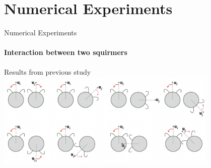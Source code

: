 \documentclass{beamer}
\begin{document}
\section{Numerical Experiments}
\begin{frame}{Numerical Experiments}
    \framesubtitle{Interaction between two squirmers}
    \begin{center}
        Results from previous study \cite{Stark}
        \includegraphics[width=0.8\textwidth]{../images/stark_behavior.png}
    \end{center}
\end{frame}
\end{document}
